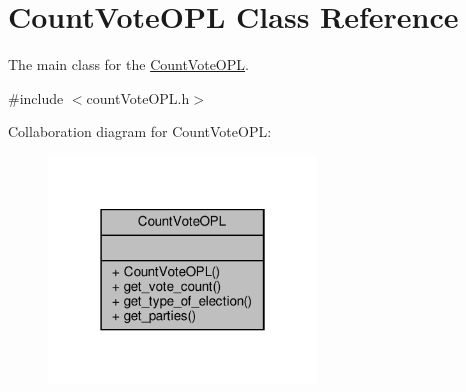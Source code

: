 \hypertarget{classCountVoteOPL}{}\section{Count\+Vote\+O\+PL Class Reference}
\label{classCountVoteOPL}


The main class for the \hyperlink{classCountVoteOPL}{Count\+Vote\+O\+PL}.  




{\ttfamily \#include $<$count\+Vote\+O\+P\+L.\+h$>$}



Collaboration diagram for Count\+Vote\+O\+PL\+:\nopagebreak
\begin{figure}[H]
\begin{center}
\leavevmode
\includegraphics[width=202pt]{classCountVoteOPL__coll__graph}
\end{center}
\end{figure}
